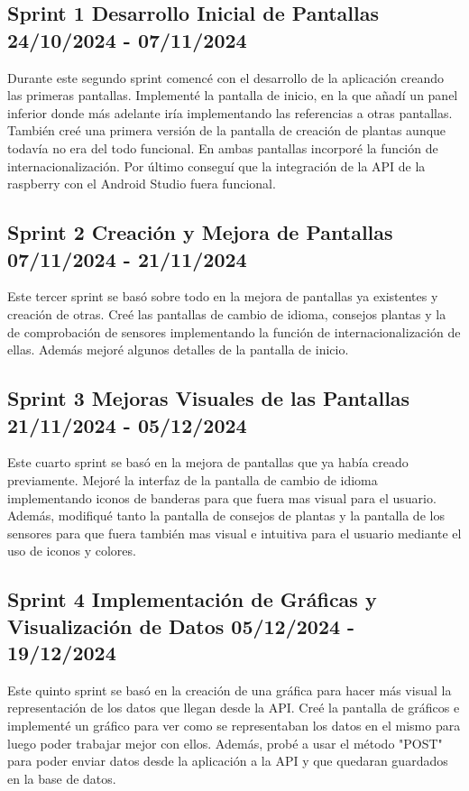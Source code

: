 \subsection{Sprint 1 Desarrollo Inicial de Pantallas 24/10/2024 - 07/11/2024}
Durante este segundo sprint comencé con el desarrollo de la aplicación creando las primeras pantallas. Implementé la pantalla de inicio, en la que añadí un panel inferior donde más adelante iría implementando las referencias a otras pantallas. También creé una primera versión de la pantalla de creación de plantas aunque todavía no era del todo funcional. En ambas pantallas incorporé la función de internacionalización. Por último conseguí que la integración de la API de la raspberry con el Android Studio fuera funcional.

\subsection{Sprint 2 Creación y Mejora de Pantallas 07/11/2024 - 21/11/2024}
Este tercer sprint se basó sobre todo en la mejora de pantallas ya existentes y creación de otras. Creé las pantallas de cambio de idioma, consejos plantas y la de comprobación de sensores implementando la función de internacionalización de ellas. Además mejoré algunos detalles de la pantalla de inicio.

\subsection{Sprint 3 Mejoras Visuales de las Pantallas  21/11/2024 - 05/12/2024}
Este cuarto sprint se basó en la mejora de pantallas que ya había creado previamente. Mejoré la interfaz de la pantalla de cambio de idioma implementando iconos de banderas para que fuera mas visual para el usuario. Además, modifiqué tanto la pantalla de consejos de plantas y la pantalla de los sensores para que fuera también mas visual e intuitiva para el usuario mediante el uso de iconos y colores.


\subsection{Sprint 4 Implementación de Gráficas y Visualización de Datos 05/12/2024 - 19/12/2024}
Este quinto sprint se basó en la creación de una gráfica para hacer más visual la representación de los datos que llegan desde la API. Creé la pantalla de gráficos e implementé un gráfico para ver como se representaban los datos en el mismo para luego poder trabajar mejor con ellos. Además, probé a usar el método "POST" para poder enviar datos desde la aplicación a la API y que quedaran guardados en la base de datos.

